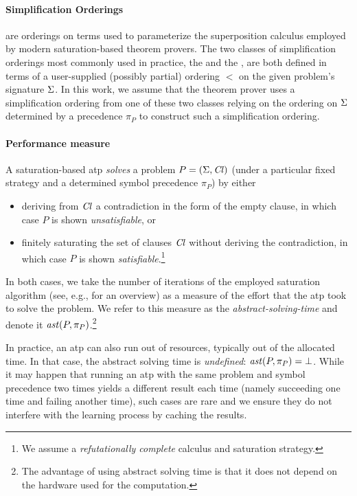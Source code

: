\documentclass[a4paper]{easychair}
\begin{document}
\paragraph{Simplification Orderings} are orderings on terms used to parameterize the superposition calculus \cite{DBLP:books/el/RV01/NieuwenhuisR01}
employed by modern saturation-based theorem provers. The two classes of simplification orderings most commonly used in practice,
the  \cite{Knuth1983} and the  \cite{Kamin1980}, are both defined in terms 
of a user-supplied (possibly partial) ordering $<$ %
on the given problem's signature \(\operatorname{\Sigma}\).
In this work, we assume that the theorem prover uses a simplification ordering from one of these two classes
relying on the ordering on \(\operatorname{\Sigma}\) determined by a precedence \(\pi_P\) to construct such a simplification ordering.

\paragraph{Performance measure} A saturation-based \gls*{atp} \emph{solves} a problem \(P = (\operatorname{\Sigma},\operatorname{\mathit{Cl}})\)
(under a particular fixed strategy and a determined symbol precedence \(\pi_P\))  by either
\begin{itemize}
\item
	deriving from \(\operatorname{\mathit{Cl}}\) a contradiction in the form of the empty clause,
	in which case \(P\) is shown \emph{unsatisfiable}, or
\item
	finitely saturating the set of clauses \(\operatorname{\mathit{Cl}}\) without deriving the contradiction,
	in which case \(P\) is shown \emph{satisfiable}.\footnote{We assume a \emph{refutationally complete} calculus and saturation strategy.}	
\end{itemize}
In both cases, we take the number of iterations of the employed saturation algorithm (see, e.g., \citet{DBLP:journals/jsc/RiazanovV03} for an overview) 
as a measure of the effort that the \gls*{atp} took to solve the problem.
We refer to this measure as the \emph{\gls*{abstract-solving-time}} and denote it \(\operatorname{\mathit{ast}}(P,\pi_P)\).\footnote{The advantage of using abstract solving time is that it does not depend on the hardware used for the computation.}

In practice, an \gls*{atp} can also run out of resources, typically out of the allocated time.
In that case, the abstract solving time is \emph{undefined}: \(\operatorname{\mathit{ast}}(P,\pi_P) = \bot\).
%
While it may happen that running an \gls*{atp} with the same problem and symbol precedence two times
yields a different result each time (namely succeeding one time and failing another time),
such cases are rare and we ensure they do not interfere with the learning process by caching the results.
\end{document}
